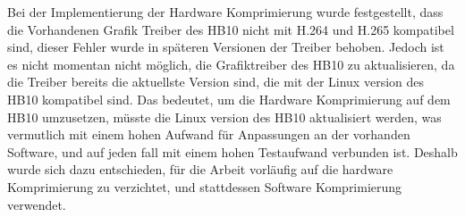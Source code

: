 Bei der Implementierung der Hardware Komprimierung wurde festgestellt, dass die Vorhandenen Grafik Treiber des HB10 nicht mit H.264 und H.265 kompatibel sind, dieser Fehler wurde in späteren Versionen der Treiber behoben. Jedoch ist es nicht momentan nicht möglich,
die Grafiktreiber des HB10 zu aktualisieren, da die Treiber bereits die aktuellste Version sind, die mit der Linux version des HB10 kompatibel sind. Das bedeutet, um die Hardware Komprimierung auf dem HB10 umzusetzen, müsste die Linux version des HB10 aktualisiert werden,
was vermutlich mit einem hohen Aufwand für Anpassungen an der vorhanden Software, und auf jeden fall mit einem hohen Testaufwand verbunden ist. Deshalb wurde sich dazu entschieden, für die Arbeit vorläufig auf die hardware Komprimierung zu verzichtet, und stattdessen Software Komprimierung
verwendet.

\newpage